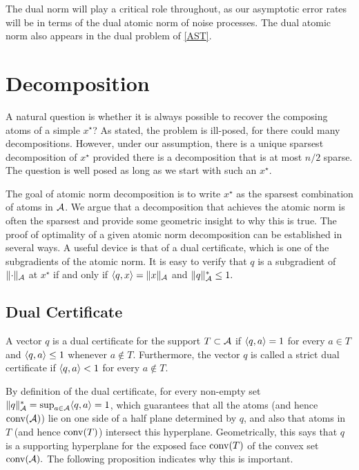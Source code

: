 The dual norm will play a critical role throughout, as our asymptotic error
rates will be in terms of the dual atomic norm of noise processes. The dual
atomic norm also appears in the dual problem of \eqref{AST}.

\section{Decomposition}
\label{sec:decomposition}

A natural question is whether it is always possible to recover the composing
atoms of a simple $x^\star$? As stated, the problem is ill-posed, for there
could many decompositions. However, under our assumption, there is a unique
sparsest decomposition of $x^\star$ provided there is a decomposition that is at
most $n/2$ sparse. The question is well posed as long as we start with such an $x^\star.$

The goal of atomic norm decomposition is to write $x^\star$ as the sparsest
combination of atoms in $\mathcal{A}$. We argue that a decomposition that achieves the
atomic norm is often the sparsest and provide some geometric insight to why this
is true. The proof of optimality of a given atomic norm decomposition can be
established in several ways. A useful device is that of a dual certificate,
which is one of the subgradients of the atomic norm. It is easy to verify that
$q$ is a subgradient of $\lVert\cdot\rVert_{\mathcal{A}} $ at $x^\star$ if and only if $\langle
q, x \rangle = \lVert x\rVert_{\mathcal{A}}$ and $\lVert q\rVert_{\mathcal{A}}^* \leq 1.$

\subsection{Dual Certificate}

\begin{definition}\label{def:dual-certificate}
A vector $q$ is a dual certificate for the support $T \subset \mathcal{A}$ if 
$\langle q, a\rangle = 1$ for every $a \in T$ and $\langle q, a\rangle \leq 1$ whenever $a \not\in T$. Furthermore, the vector $q$ is called a strict dual certificate if $\langle q, a\rangle < 1$ for every $a \not\in T.$
\end{definition}

By definition of the dual certificate, for every non-empty set $\lVert q\rVert_{\mathcal{A}}^* =
\sup_{a \in \mathcal{A}} \langle q, a\rangle = 1$, which guarantees that all the atoms (and hence
$\operatorname{conv}(\mathcal{A})$) lie on one side of a half plane determined by $q$, and also that
atoms in $T$ (and hence $\operatorname{conv}(T)$) intersect this hyperplane. Geometrically,
this says that $q$ is a supporting hyperplane for the exposed face $\operatorname{conv}(T)$ of
the convex set $\operatorname{conv}(\mathcal{A}).$ The following proposition indicates why this is important.


